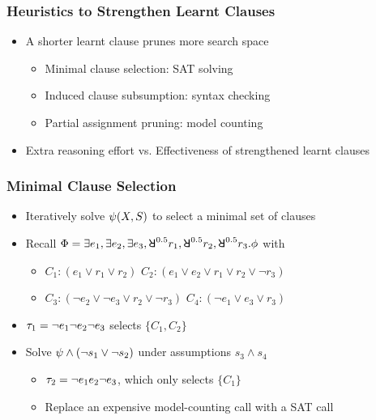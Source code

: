 \begin{frame}
    \frametitle{Heuristics to Strengthen Learnt Clauses}
    \begin{itemize}
        \item A shorter learnt clause prunes more search space
              \pause
              \begin{itemize}
                  \item Minimal clause selection: SAT solving
                        \pause
                  \item Induced clause subsumption: syntax checking
                        \pause
                  \item Partial assignment pruning: model counting
                        \pause
              \end{itemize}
        \item Extra reasoning effort vs. Effectiveness of strengthened learnt clauses
    \end{itemize}
\end{frame}

\begin{frame}
    \frametitle{Minimal Clause Selection}
    \begin{itemize}
        \item Iteratively solve $\psi(X,S)$ to select a minimal set of clauses
              \pause
        \item Recall $\Qf=\exists e_1,\exists e_2,\exists e_3,\random{0.5} r_1,\random{0.5} r_2,\random{0.5} r_3.\pf$ with
              \begin{itemize}
                  \item[] $C_1: (e_1 \lor r_1 \lor r_2)$ $C_2: (e_1 \lor e_2 \lor r_1 \lor r_2 \lor \lnot r_3)$
                  \item[] $C_3: (\lnot e_2 \lor \lnot e_3 \lor r_2 \lor \lnot r_3)$ $C_4: (\lnot e_1 \lor e_3 \lor r_3)$
              \end{itemize}
              \pause
        \item $\tau_1=\lnot e_1 \lnot e_2 \lnot e_3$ selects $\{C_1,C_2\}$
              \pause
        \item Solve $\psi\land(\lnot s_1\lor\lnot s_2)$ under assumptions $s_3\land s_4$
              \pause
              \begin{itemize}
                  \item $\tau_2=\lnot e_1 e_2 \lnot e_3$, which only selects $\{C_1\}$
                        \pause
                  \item Replace an expensive model-counting call with a SAT call
              \end{itemize}
    \end{itemize}
\end{frame}

